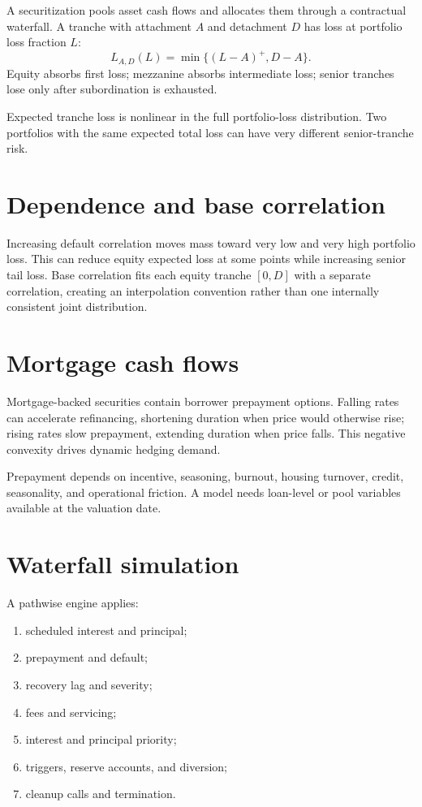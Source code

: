 A securitization pools asset cash flows and allocates them through a contractual
waterfall. A tranche with attachment $A$ and detachment $D$ has loss at portfolio
loss fraction $L$:
\[
L_{A,D}(L)=
\min\{(L-A)^+,D-A\}.
\]
Equity absorbs first loss; mezzanine absorbs intermediate loss; senior tranches lose
only after subordination is exhausted.

Expected tranche loss is nonlinear in the full portfolio-loss distribution. Two
portfolios with the same expected total loss can have very different senior-tranche
risk.

\section{Dependence and base correlation}

Increasing default correlation moves mass toward very low and very high portfolio
loss. This can reduce equity expected loss at some points while increasing senior
tail loss. Base correlation fits each equity tranche $[0,D]$ with a separate
correlation, creating an interpolation convention rather than one internally
consistent joint distribution.

\section{Mortgage cash flows}

Mortgage-backed securities contain borrower prepayment options. Falling rates can
accelerate refinancing, shortening duration when price would otherwise rise;
rising rates slow prepayment, extending duration when price falls. This negative
convexity drives dynamic hedging demand.

Prepayment depends on incentive, seasoning, burnout, housing turnover, credit,
seasonality, and operational friction. A model needs loan-level or pool variables
available at the valuation date.

\section{Waterfall simulation}

A pathwise engine applies:

\begin{enumerate}
\item scheduled interest and principal;
\item prepayment and default;
\item recovery lag and severity;
\item fees and servicing;
\item interest and principal priority;
\item triggers, reserve accounts, and diversion;
\item cleanup calls and termination.
\end{enumerate}

